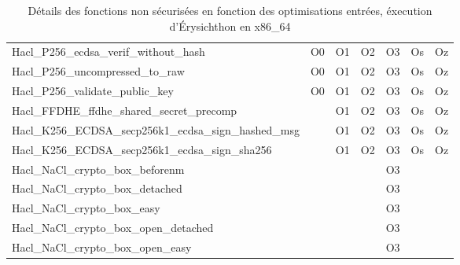 \begin{table}[!ht]
\begin{tabular}{l|cccccc}
    \rowcolor{blue!5}
    Hacl\_P256\_ecdsa\_verif\_without\_hash & O0 & O1 & O2 & O3 & Os & Oz \\
    Hacl\_P256\_uncompressed\_to\_raw & O0 & O1 & O2 & O3 & Os & Oz \\
    \rowcolor{blue!5}
    Hacl\_P256\_validate\_public\_key & O0 & O1 & O2 & O3 & Os & Oz \\
    Hacl\_FFDHE\_ffdhe\_shared\_secret\_precomp & & O1 & O2 & O3 & Os & Oz \\
    \rowcolor{blue!5}
    Hacl\_K256\_ECDSA\_secp256k1\_ecdsa\_sign\_hashed\_msg & & O1 & O2 & O3 & Os & Oz \\
    Hacl\_K256\_ECDSA\_secp256k1\_ecdsa\_sign\_sha256 & & O1 & O2 & O3 & Os & Oz \\
    \rowcolor{blue!5}
    Hacl\_NaCl\_crypto\_box\_beforenm & & & & O3 & &  \\
    Hacl\_NaCl\_crypto\_box\_detached & & & & O3 & &  \\
    \rowcolor{blue!5}
    Hacl\_NaCl\_crypto\_box\_easy& & & & O3 & &  \\
    Hacl\_NaCl\_crypto\_box\_open\_detached & & & & O3 & & \\
    \rowcolor{blue!5}
    Hacl\_NaCl\_crypto\_box\_open\_easy& & & & O3 & &  \\
  \end{tabular}
  \caption{Détails des fonctions non sécurisées en fonction des optimisations entrées, éxecution d'Érysichthon en x86\_64}
  \label{tab:resultats_insecure}
\end{table}
